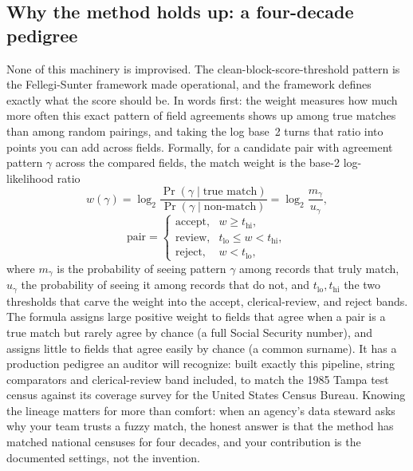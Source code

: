 \documentclass[
    a4paper,
    fontsize=10pt,
    twoside=true,
    numbers=noenddot,
]{kaobook}
\begin{document}
\subsection{Why the method holds up: a four-decade pedigree}\label{sec:ch06-fspedigree}
None of this machinery is improvised. The clean-block-score-threshold pattern is the Fellegi-Sunter framework made operational, and the framework defines exactly what the score should be. In words first: the weight measures how much more often this exact pattern of field agreements shows up among true matches than among random pairings, and taking the log base~2 turns that ratio into points you can add across fields. Formally, for a candidate pair with agreement pattern $\gamma$ across the compared fields, the match weight is the base-2 log-likelihood ratio
\[
  w(\gamma)=\log_2\frac{\Pr(\gamma\mid\text{true match})}{\Pr(\gamma\mid\text{non-match})}
           =\log_2\frac{m_\gamma}{u_\gamma},
\]
\[
  \text{pair}=\begin{cases}
    \text{accept}, & w \ge t_{\text{hi}},\\
    \text{review}, & t_{\text{lo}} \le w < t_{\text{hi}},\\
    \text{reject}, & w < t_{\text{lo}},
  \end{cases}
\]
where $m_\gamma$ is the probability of seeing pattern $\gamma$ among records that truly match, $u_\gamma$ the probability of seeing it among records that do not, and $t_{\text{lo}},t_{\text{hi}}$ the two thresholds that carve the weight into the accept, clerical-review, and reject bands. The formula assigns large positive weight to fields that agree when a pair is a true match but rarely agree by chance (a full Social Security number), and assigns little to fields that agree easily by chance (a common surname). It has a production pedigree an auditor will recognize: \textcite{jaro1989tampa} built exactly this pipeline, string comparators and clerical-review band included, to match the 1985 Tampa test census against its coverage survey for the United States Census Bureau. Knowing the lineage matters for more than comfort: when an agency's data steward asks why your team trusts a fuzzy match, the honest answer is that the method has matched national censuses for four decades, and your contribution is the documented settings, not the invention.
\end{document}
